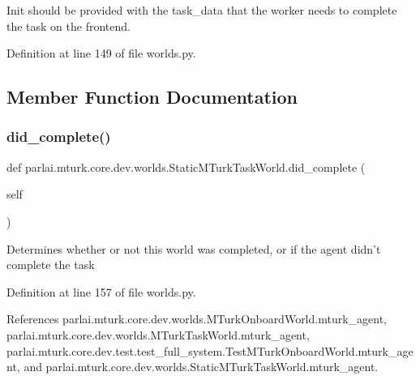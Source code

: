 \begin{DoxyVerb}Init should be provided with the task_data that the worker needs
to complete the task on the frontend.
\end{DoxyVerb}
 

Definition at line 149 of file worlds.\+py.



\subsection{Member Function Documentation}
\mbox{\label{classparlai_1_1mturk_1_1core_1_1dev_1_1worlds_1_1StaticMTurkTaskWorld_a43d4e4711cd363ab8e018d856a4697e9}} 
\subsubsection{\texorpdfstring{did\+\_\+complete()}{did\_complete()}}
{\footnotesize\ttfamily def parlai.\+mturk.\+core.\+dev.\+worlds.\+Static\+M\+Turk\+Task\+World.\+did\+\_\+complete (\begin{DoxyParamCaption}\item[{}]{self }\end{DoxyParamCaption})}

\begin{DoxyVerb}Determines whether or not this world was completed, or if the agent
didn't complete the task\end{DoxyVerb}
 

Definition at line 157 of file worlds.\+py.



References parlai.\+mturk.\+core.\+dev.\+worlds.\+M\+Turk\+Onboard\+World.\+mturk\+\_\+agent, parlai.\+mturk.\+core.\+dev.\+worlds.\+M\+Turk\+Task\+World.\+mturk\+\_\+agent, parlai.\+mturk.\+core.\+dev.\+test.\+test\+\_\+full\+\_\+system.\+Test\+M\+Turk\+Onboard\+World.\+mturk\+\_\+agent, and parlai.\+mturk.\+core.\+dev.\+worlds.\+Static\+M\+Turk\+Task\+World.\+mturk\+\_\+agent.

\mbox{\label{classparlai_1_1mturk_1_1core_1_1dev_1_1worlds_1_1StaticMTurkTaskWorld_af6460dcb2a232ba0bd7ebfe8d386f5b6}} 
